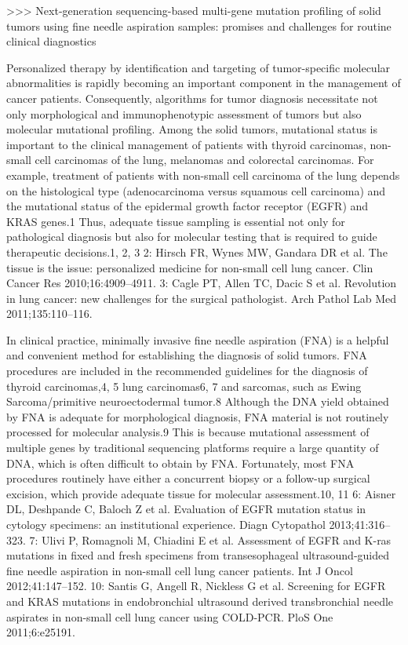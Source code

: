 >>> Next-generation sequencing-based multi-gene mutation profiling of solid tumors using fine needle aspiration samples: promises and challenges for routine clinical diagnostics

Personalized therapy by identification and targeting of tumor-specific molecular abnormalities is rapidly becoming an important component in the management of cancer patients. Consequently, algorithms for tumor diagnosis necessitate not only morphological and immunophenotypic assessment of tumors but also molecular mutational profiling. Among the solid tumors, mutational status is important to the clinical management of patients with thyroid carcinomas, non-small cell carcinomas of the lung, melanomas and colorectal carcinomas. For example, treatment of patients with non-small cell carcinoma of the lung depends on the histological type (adenocarcinoma versus squamous cell carcinoma) and the mutational status of the epidermal growth factor receptor (EGFR) and KRAS genes.1 Thus, adequate tissue sampling is essential not only for pathological diagnosis but also for molecular testing that is required to guide therapeutic decisions.1, 2, 3
2: Hirsch FR, Wynes MW, Gandara DR et al. The tissue is the issue: personalized medicine for non-small cell lung cancer. Clin Cancer Res 2010;16:4909–4911.
3: Cagle PT, Allen TC, Dacic S et al. Revolution in lung cancer: new challenges for the surgical pathologist. Arch Pathol Lab Med 2011;135:110–116.

In clinical practice, minimally invasive fine needle aspiration (FNA) is a helpful and convenient method for establishing the diagnosis of solid tumors. FNA procedures are included in the recommended guidelines for the diagnosis of thyroid carcinomas,4, 5 lung carcinomas6, 7 and sarcomas, such as Ewing Sarcoma/primitive neuroectodermal tumor.8 Although the DNA yield obtained by FNA is adequate for morphological diagnosis, FNA material is not routinely processed for molecular analysis.9 This is because mutational assessment of multiple genes by traditional sequencing platforms require a large quantity of DNA, which is often difficult to obtain by FNA. Fortunately, most FNA procedures routinely have either a concurrent biopsy or a follow-up surgical excision, which provide adequate tissue for molecular assessment.10, 11
6: Aisner DL, Deshpande C, Baloch Z et al. Evaluation of EGFR mutation status in cytology specimens: an institutional experience. Diagn Cytopathol 2013;41:316–323.
7: Ulivi P, Romagnoli M, Chiadini E et al. Assessment of EGFR and K-ras mutations in fixed and fresh specimens from transesophageal ultrasound-guided fine needle aspiration in non-small cell lung cancer patients. Int J Oncol 2012;41:147–152.
10: Santis G, Angell R, Nickless G et al. Screening for EGFR and KRAS mutations in endobronchial ultrasound derived transbronchial needle aspirates in non-small cell lung cancer using COLD-PCR. PloS One 2011;6:e25191.

